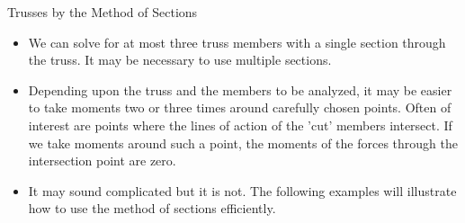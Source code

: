 \documentclass[9pt, xcolor={svgnames, x11names},professionalfonts]{beamer}
\def\scale{1}
\begin{document}
\begin{frame}{Trusses by the Method of Sections}
	\begin{itemize}
		\item We can solve for at most three truss members with a single section through the truss. It may be necessary to use multiple sections.\parb
		\item Depending upon the truss and the members to be analyzed, it may be easier to take moments two or three times around carefully chosen points. Often of interest are points where the lines of action of the 'cut' members intersect.\parm
		 If we take moments around such a point, the moments of the forces through the intersection point are zero.\parb
		\item It may sound complicated but it is not. The following examples will illustrate how to use the method of sections efficiently.
	\end{itemize}

\end{frame}


\begin{frame}{}	
	\begin{myexam}{}{}
		\def\scale{0.675}
		\parb\centering
		
		\parb
		\pars
		\addtocounter{\tcbcounter}{-1}
	\end{myexam}
\end{frame}
	
\end{document}
